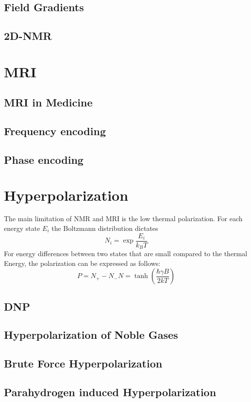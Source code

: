 		\subsection{Field Gradients}
		\subsection{2D-NMR}
	\section{MRI}
		\subsection{MRI in Medicine}
		\subsection{Frequency encoding}
		\subsection{Phase encoding}
	\section{Hyperpolarization}
		The main limitation of NMR and MRI is the low thermal polarization.
		For each energy state $E_i$ the Boltzmann distribution dictates
		\begin{equation}
			N_i = \exp{\frac{E_i}{k_B T}}
		\end{equation}
		For energy differences between two states that are small compared to
		the thermal Energy, the polarization can be expressed as follows:
		\begin{equation}
			P = {N_+-N_-}{N} = \tanh\left(\frac{\hbar \gamma B}{2 k T }\right)
		\end{equation}
		\subsection{DNP}
		\subsection{Hyperpolarization of Noble Gases}
		\subsection{Brute Force Hyperpolarization}
		\subsection{Parahydrogen induced Hyperpolarization}
